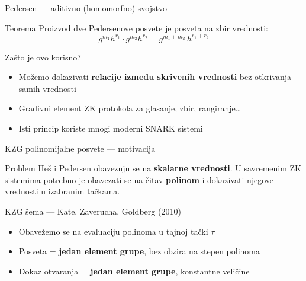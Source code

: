 \documentclass[aspectratio=1610]{beamer}
\newcommand{\keyword}[1]{\textcolor{wcprimary}{\textbf{#1}}}
\begin{document}
\begin{frame}{Pedersen — aditivno (homomorfno) svojstvo}

\begin{block}{Teorema}
  Proizvod dve Pedersenove posvete je posveta na zbir vrednosti:
  \[
    g^{m_1} h^{r_1} \cdot g^{m_2} h^{r_2} = g^{m_1 + m_2}\, h^{r_1 + r_2}
  \]
\end{block}

\begin{exampleblock}{Zašto je ovo korisno?}
  \begin{itemize}
    
    \item Možemo dokazivati \keyword{relacije između skrivenih vrednosti} bez otkrivanja samih vrednosti
  \end{itemize}
  \begin{itemize}
    {\footnotesize (npr.\ zbir skrivenih glasova zadovoljava neki uslov, bez da vidimo individualne glasove)}
    \item Gradivni element ZK protokola za glasanje, zbir, rangiranje\ldots
    \item Isti princip koriste mnogi moderni SNARK sistemi
  \end{itemize}
\end{exampleblock}
\end{frame}


\begin{frame}{KZG polinomijalne posvete — motivacija}
\begin{block}{Problem}
  Heš i Pedersen obavezuju se na \keyword{skalarne vrednosti}.
  U savremenim ZK sistemima potrebno je obavezati se na čitav \keyword{polinom}
  i dokazivati njegove vrednosti u izabranim tačkama.
\end{block}

\begin{exampleblock}{KZG šema — Kate, Zaverucha, Goldberg (2010)}
  \begin{itemize}
    
    \item Obavežemo se na evaluaciju polinoma u tajnoj tački $\tau$
    \item Posveta = \keyword{jedan element grupe}, bez obzira na stepen polinoma
    \item Dokaz otvaranja = \keyword{jedan element grupe}, konstantne veličine
  \end{itemize}
\end{exampleblock}
\end{frame}
\end{document}
